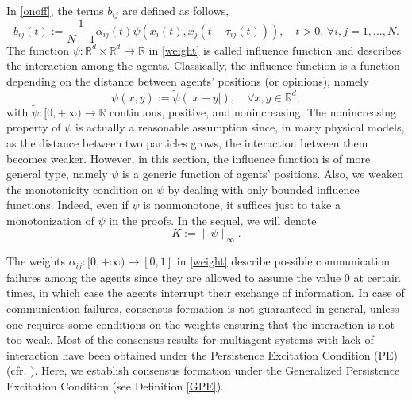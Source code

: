 \documentclass[11pt]{article}
\begin{document}
	In \eqref{onoff}, the terms $b_{ij}$ are defined as follows,
	\begin{equation}\label{weight}
		b_{ij}(t):=\frac{1}{N-1}{\alpha_{ij}(t)}\psi( x_{i}(t), x_{j}(t-\tau_{ij}(t))), \quad t>0,\, \forall i,j=1,\dots,N.
	\end{equation}
	The function $\psi:\mathbb{R}^d\times\mathbb{R}^d\rightarrow \mathbb{R}$ in \eqref{weight} is called influence function and describes the interaction among the agents. Classically, the influence function is a function depending on the distance between agents' positions (or opinions), namely
	\begin{equation}\label{psi}
		\psi(x,y):=\tilde\psi(\lvert x-y\rvert),\quad \forall x,y\in\mathbb{R}^d,
	\end{equation}
	with $\tilde\psi:[0,+\infty)\rightarrow\mathbb{R}$  continuous, positive, and nonincreasing. The nonincreasing property of $\psi$ is actually a reasonable assumption since, in many physical models, as the distance between two particles grows, the interaction between them becomes weaker. However, in this section, the influence function is of more general type, namely $\psi$ is a generic function of agents' positions. Also, we weaken the monotonicity condition on $\psi$ by dealing with only bounded influence functions. Indeed, even if $\psi$ is nonmonotone, it suffices just to take a monotonization of $\psi$ in the proofs. In the sequel, we will denote
	\begin{equation}\label{K}
		K:=\lVert \psi\rVert_{\infty}.
	\end{equation} 
	
	The weights $\alpha_{ij}:[0,+\infty)\rightarrow [0,1]$ in \eqref{weight} describe possible communication failures among the agents since they are allowed to assume the value 0 at certain times, in which case the agents interrupt their exchange of information. In case of communication failures, consensus formation is not guaranteed in general, unless one requires some conditions on the weights ensuring that the interaction is not too weak. Most of the consensus results for multiagent systems with lack of interaction have been obtained under the Persistence Excitation Condition (PE) (cfr. \cite{AnconaRossi, Bonnet, CCP}). Here, we establish consensus formation under the Generalized Persistence Excitation Condition (see Definition \ref{GPE}). 
	
	\vspace{0.1cm}
	
\end{document}
